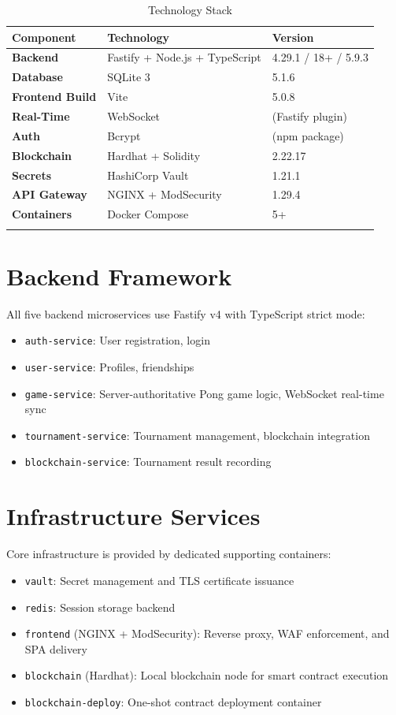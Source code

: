 \documentclass[11pt,a4paper]{report}
\begin{document}
\begin{longtable}[h]{p{3cm}p{5cm}p{4cm}}
\hline
\textbf{Component} & \textbf{Technology} & \textbf{Version} \\
\hline
\endhead
\hline
\endfoot
\textbf{Backend} & Fastify + Node.js + TypeScript & 4.29.1 / 18+ / 5.9.3 \\
\textbf{Database} & SQLite 3 & 5.1.6 \\
\textbf{Frontend Build} & Vite & 5.0.8 \\
\textbf{Real-Time} & WebSocket & (Fastify plugin) \\
\textbf{Auth} & Bcrypt & (npm package) \\
\textbf{Blockchain} & Hardhat + Solidity & 2.22.17 \\
\textbf{Secrets} & HashiCorp Vault & 1.21.1 \\
\textbf{API Gateway} & NGINX + ModSecurity & 1.29.4 \\
\textbf{Containers} & Docker Compose & 5+ \\
\caption{Technology Stack}
\label{tab:tech_stack}
\end{longtable}

\section{Backend Framework}
All five backend microservices use Fastify v4 with TypeScript strict mode:
\begin{itemize}
  \item \texttt{auth-service}: User registration, login
  \item \texttt{user-service}: Profiles, friendships
  \item \texttt{game-service}: Server-authoritative Pong game logic, WebSocket real-time sync
  \item \texttt{tournament-service}: Tournament management, blockchain integration
  \item \texttt{blockchain-service}: Tournament result recording
\end{itemize}

\section{Infrastructure Services}
Core infrastructure is provided by dedicated supporting containers:
\begin{itemize}
  \item \texttt{vault}: Secret management and TLS certificate issuance
  \item \texttt{redis}: Session storage backend
  \item \texttt{frontend} (NGINX + ModSecurity): Reverse proxy, WAF enforcement, and SPA delivery
  \item \texttt{blockchain} (Hardhat): Local blockchain node for smart contract execution
  \item \texttt{blockchain-deploy}: One-shot contract deployment container
\end{itemize}
\end{document}
